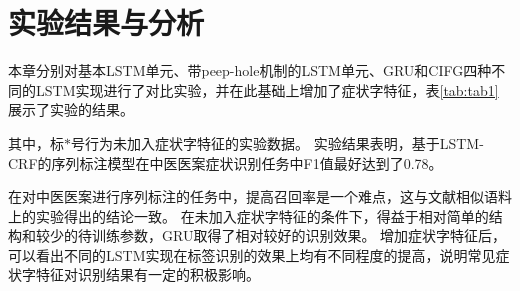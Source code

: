 \section{实验结果与分析}
本章分别对基本LSTM单元、带peep-hole机制的LSTM单元、GRU和CIFG四种不同的LSTM实现进行了对比实验，并在此基础上增加了症状字特征，表\ref{tab:tab1}展示了实验的结果。

其中，标$*$号行为未加入症状字特征的实验数据。
实验结果表明，基于LSTM-CRF的序列标注模型在中医医案症状识别任务中F1值最好达到了0.78。

在对中医医案进行序列标注的任务中，提高召回率是一个难点，这与文献相似语料上的实验得出的结论一致。
在未加入症状字特征的条件下，得益于相对简单的结构和较少的待训练参数，GRU取得了相对较好的识别效果。
增加症状字特征后，可以看出不同的LSTM实现在标签识别的效果上均有不同程度的提高，说明常见症状字特征对识别结果有一定的积极影响。


